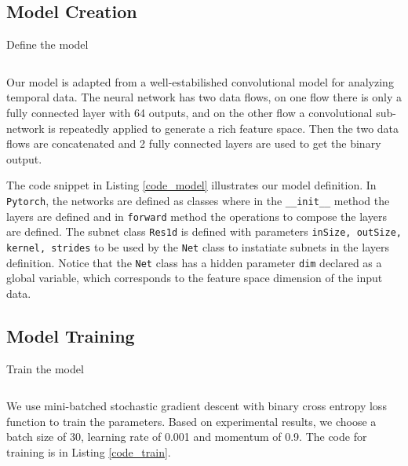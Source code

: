 \documentclass[a4paper,12pt]{article}
\newcommand{\torch}{\texttt{Pytorch}}
\begin{document}
\subsection{Model Creation}
\begin{listing}[H]
	\caption{Define the model}
	\inputminted[frame=single,framesep=10pt,linenos]{python3}{torch_model.py}
	\label{code_model}
\end{listing}
Our model is adapted from a well-estabilished convolutional model for analyzing temporal data. The neural network has two data flows, on one flow there is only a fully connected layer with 64 outputs, and on the other flow a convolutional sub-network is repeatedly applied to generate a rich feature space. Then the two data flows are concatenated and 2 fully connected layers are used to get the binary output.

The code snippet in Listing \ref{code_model} illustrates our model definition. In \torch, the networks are defined as classes where in the \texttt{\_\_init\_\_} method the layers are defined and in \texttt{forward} method the operations to compose the layers are defined. The subnet class \texttt{Res1d} is defined with parameters \texttt{inSize, outSize, kernel, strides} to be used by the \texttt{Net} class to instatiate subnets in the layers definition. Notice that the \texttt{Net} class has a hidden parameter \texttt{dim} declared as a global variable, which corresponds to the feature space dimension of the input data.

\subsection{Model Training}
\begin{listing}[H]
	\caption{Train the model}
	\inputminted[frame=single,framesep=10pt,linenos]{python3}{train.py}
	\label{code_train}
\end{listing}
We use mini-batched stochastic gradient descent with binary cross entropy loss function to train the parameters. Based on experimental results, we choose a batch size of 30, learning rate of 0.001 and momentum of 0.9. The code for training is in Listing \ref{code_train}.
\end{document}
